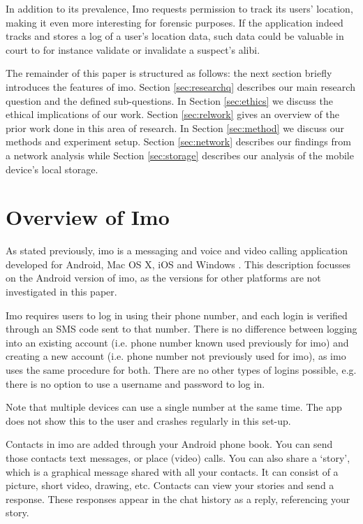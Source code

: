 \documentclass[conference]{IEEEtran}
\begin{document}
In addition to its prevalence, Imo requests permission to track its users'
location, making it even more interesting for forensic purposes. If the
application indeed tracks and stores a log of a user's location data, such data
could be valuable in court to for instance validate or invalidate a suspect's
alibi.

The remainder of this paper is structured as follows: the next section briefly
introduces the features of imo. Section \ref{sec:researchq} describes our main
research question and the defined sub-questions. In Section \ref{sec:ethics} we
discuss the ethical implications of our work. Section \ref{sec:relwork} gives an
overview of the prior work done in this area of research. In Section
\ref{sec:method} we discuss our methods and experiment setup. Section
\ref{sec:network} describes our findings from a network analysis while Section
\ref{sec:storage} describes our analysis of the mobile device's local storage.



\section{Overview of Imo}

As stated previously, imo is a messaging and voice and video calling application
developed for Android, Mac OS X, iOS and Windows \cite{imo}. This description
focusses on the Android version of imo, as the versions for other platforms are
not investigated in this paper.

Imo requires users to log in using their phone number, and each login is
verified through an SMS code sent to that number. There is no difference between
logging into an existing account (i.e. phone number known used previously for
imo) and creating a new account (i.e. phone number not previously used for imo),
as imo uses the same procedure for both. There are no other types of logins
possible, e.g. there is no option to use a username and password to log in.

Note that multiple devices can use a single number at the same time. The app
does not show this to the user and crashes regularly in this set-up.

Contacts in imo are added through your Android phone book. You can send those
contacts text messages, or place (video) calls. You can also share a `story',
which is a graphical message shared with all your contacts. It can consist of a
picture, short video, drawing, etc. Contacts can view your stories and send a
response. These responses appear in the chat history as a reply, referencing
your story.
\end{document}
